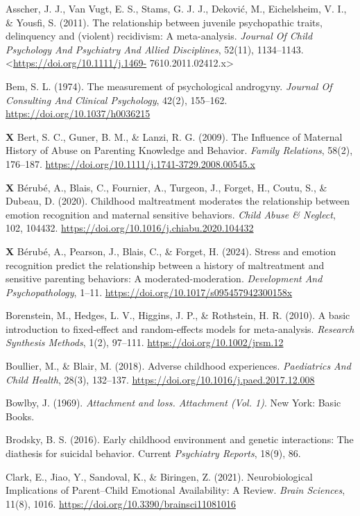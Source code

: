 \documentclass[12pt]{article}
\begin{document}
Asscher, J. J., Van Vugt, E. S., Stams, G. J. J., Deković, M.,
Eichelsheim, V. I., \& Yousfi, S. (2011). The relationship between
juvenile psychopathic traits, delinquency and (violent) recidivism: A
meta-analysis. \emph{Journal Of Child Psychology And Psychiatry And
Allied Disciplines}, 52(11), 1134--1143.
\textless{}\url{https://doi.org/10.1111/j.1469-}
7610.2011.02412.x\textgreater{}

Bem, S. L. (1974). The measurement of psychological androgyny.
\emph{Journal Of Consulting And Clinical Psychology}, 42(2), 155--162.
\url{https://doi.org/10.1037/h0036215}

\textbf{X} Bert, S. C., Guner, B. M., \& Lanzi, R. G. (2009). The
Influence of Maternal History of Abuse on Parenting Knowledge and
Behavior. \emph{Family Relations}, 58(2), 176--187.
\url{https://doi.org/10.1111/j.1741-3729.2008.00545.x}

\textbf{X} Bérubé, A., Blais, C., Fournier, A., Turgeon, J., Forget, H.,
Coutu, S., \& Dubeau, D. (2020). Childhood maltreatment moderates the
relationship between emotion recognition and maternal sensitive
behaviors. \emph{Child Abuse \& Neglect}, 102, 104432.
\url{https://doi.org/10.1016/j.chiabu.2020.104432}

\textbf{X} Bérubé, A., Pearson, J., Blais, C., \& Forget, H. (2024).
Stress and emotion recognition predict the relationship between a
history of maltreatment and sensitive parenting behaviors: A
moderated-moderation. \emph{Development And Psychopathology}, 1--11.
\url{https://doi.org/10.1017/s095457942300158x}

Borenstein, M., Hedges, L. V., Higgins, J. P., \& Rothstein, H. R.
(2010). A basic introduction to fixed-effect and random-effects models
for meta-analysis. \emph{Research Synthesis Methods}, 1(2), 97--111.
\url{https://doi.org/10.1002/jrsm.12}

Boullier, M., \& Blair, M. (2018). Adverse childhood experiences.
\emph{Paediatrics And Child Health}, 28(3), 132--137.
\url{https://doi.org/10.1016/j.paed.2017.12.008}

Bowlby, J. (1969). \emph{Attachment and loss. Attachment (Vol. 1)}. New
York: Basic Books.

Brodsky, B. S. (2016). Early childhood environment and genetic
interactions: The diathesis for suicidal behavior. Current
\emph{Psychiatry Reports}, 18(9), 86.

Clark, E., Jiao, Y., Sandoval, K., \& Biringen, Z. (2021).
Neurobiological Implications of Parent--Child Emotional Availability: A
Review. \emph{Brain Sciences}, 11(8), 1016.
\url{https://doi.org/10.3390/brainsci11081016}
\end{document}
